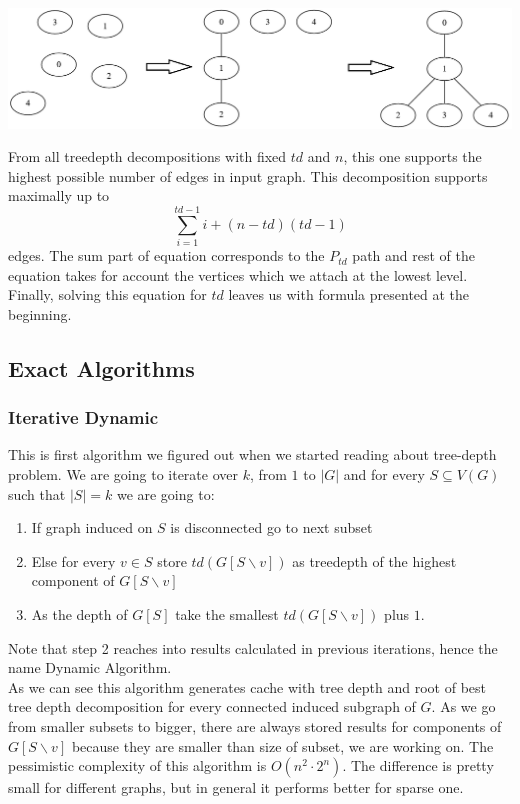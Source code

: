 \documentclass[a4paper]{article}
\begin{document}
	\begin{center}
		\includegraphics[width=\textwidth]{construction.png}
	\end{center}
	From all treedepth decompositions with fixed $td$ and $n$, this one supports the highest possible number of edges in input graph. This decomposition supports maximally up to
	$$\sum\limits_{i=1}^{td-1} i + (n-td)(td-1)$$edges. The sum part of equation corresponds to the $P_{td}$ path and rest of the equation takes for account the vertices which we attach at the lowest level.\\
	Finally, solving this equation for $td$ leaves us with formula presented at the beginning.
	\clearpage
	\subsection{Exact Algorithms}
	\subsubsection{Iterative Dynamic}
	This is ﬁrst algorithm we ﬁgured out when we started reading about tree-depth problem. We are going to iterate over $k$, from $1$ to $|G|$ and for every $S\subseteq V(G)$ such that $|S|=k$ we are going to: 
	\begin{enumerate}
		\item If graph induced on $S$ is disconnected go to next subset
		\item Else for every $v\in S$ store $td(G[S\backslash v])$ as treedepth of the highest component of $G[S\backslash v]$
		\item As the depth of $G[S]$ take the smallest $td(G[S\backslash v])$ plus $1$.
	\end{enumerate}
	Note that step 2 reaches into results calculated in previous iterations, hence the name Dynamic Algorithm.\\
	As we can see this algorithm generates cache with tree depth and root of best tree depth decomposition for every connected induced subgraph of $G$. As we go from smaller subsets to bigger, there are always stored results for components of $G[S\backslash v]$ because they are smaller than size of subset, we are working on. The pessimistic complexity of this algorithm is $O(n^2 \cdot 2^n)$. The difference is pretty small for different graphs, but in general it performs better for sparse one.
\end{document}
